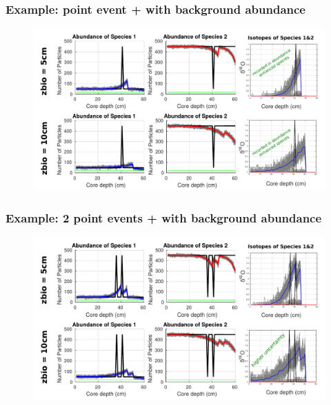 \documentclass{beamer}
\begin{document}
\begin{frame}
\frametitle{Example: point event + with background abundance}
\begin{figure}[hbtp]
\hspace*{-0.8cm}\includegraphics[width=1.1\textwidth]{figures/1point_event_5+10cm_background.pdf}%
\end{figure}
\end{frame}

\begin{frame}
\frametitle{Example: 2 point events + with background abundance}
\begin{figure}[hbtp]
\hspace*{-0.8cm}\includegraphics[width=1.1\textwidth]{figures/2point_event_5+10cm_background.pdf}%
\end{figure}
\end{frame}
\end{document}
